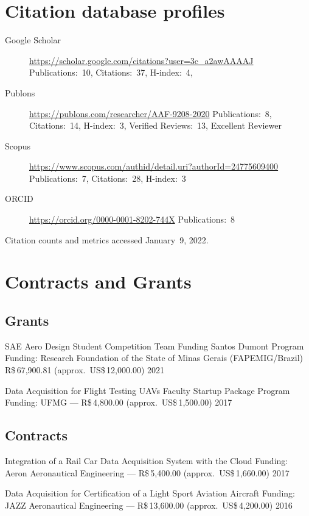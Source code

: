 \documentclass[a4paper, 11pt, oneside]{memoir}
\begin{document}
\section{Citation database profiles}
\begin{description}
\item[Google Scholar] 
  \url{https://scholar.google.com/citations?user=3c_a2awAAAAJ}\newline
  Publications:~10, Citations:~37, H-index:~4,
\item[Publons]
  \url{https://publons.com/researcher/AAF-9208-2020}\newline
  Publications:~8, Citations:~14, H-index:~3, Verified Reviews:~13, 
  Excellent Reviewer
\item[Scopus]
  \url{https://www.scopus.com/authid/detail.uri?authorId=24775609400}\newline
  Publications:~7, Citations:~28, H-index:~3
\item[ORCID]
  \url{https://orcid.org/0000-0001-8202-744X}\newline
  Publications:~8
\end{description}

\noindent
Citation counts and metrics accessed January~9, 2022.

\section{Contracts and Grants}
\subsection{Grants}
\begin{shortdesc} 
\item {SAE Aero Design Student Competition Team Funding}
{Santos Dumont Program}
{ \newline Funding: 
  Research Foundation of the State of Minas Gerais (FAPEMIG/Brazil)
  \newline
  R\$\,67,900.81 (approx.\ US\$\,12,000.00)
}{}{}
 \hfill {2021}

\item {Data Acquisition for Flight Testing UAVs}
{Faculty Startup Package Program}
{\newline Funding: UFMG --- R\$\,4,800.00 (approx.\ US\$\,1,500.00)}{}{}
\hfill {2017}
\end{shortdesc}

\subsection{Contracts}
\begin{shortdesc} 
\item {Integration of a Rail Car Data Acquisition System with the Cloud}
{}{\newline Funding: Aeron Aeronautical Engineering ---
  R\$\,5,400.00 (approx.\ US\$\,1,660.00)}{}{}
 \hfill {2017}

\item 
{Data Acquisition for Certification of a Light Sport Aviation Aircraft}{}
{\newline Funding: JAZZ Aeronautical Engineering --- 
 R\$\,13,600.00 (approx.\ US\$\,4,200.00)}{}{}
\hfill {2016}
\end{shortdesc}
\end{document}
